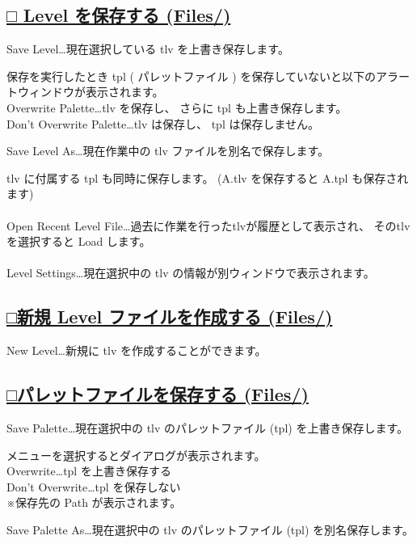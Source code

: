 \documentclass[a4paper,10pt]{article}
\begin{document}
\subsection*{\uline{□ Level を保存する (Files/)}}

\normalsize
\noindent Save Level…現在選択している tlv を上書き保存します。\par
\footnotesize
\noindent 保存を実行したとき tpl ( パレットファイル ) を保存していないと以下のアラートウィンドウが表示されます。\\
Overwrite Palette…tlv を保存し、 さらに tpl も上書き保存します。\\
Don't Overwrite Palette…tlv は保存し、 tpl は保存しません。\\[-0.7em]
\par
\normalsize
\noindent Save Level As…現在作業中の tlv ファイルを別名で保存します。\par
\footnotesize
\noindent tlv に付属する tpl も同時に保存します。 (A.tlv を保存すると A.tpl も保存されます)\\[-1em]
\\
\normalsize
Open Recent Level File…過去に作業を行ったtlvが履歴として表示され、 そのtlvを選択すると Load します。\\[-0.6em]
\\
Level Settings…現在選択中の tlv の情報が別ウィンドウで表示されます。\\[-0.5em]

\subsection*{\uline{□新規 Level ファイルを作成する (Files/)}}

\noindent New Level…新規に tlv を作成することができます。\\[-0.7em]

\subsection*{\uline{□パレットファイルを保存する (Files/)}}

\noindent Save Palette…現在選択中の tlv のパレットファイル (tpl) を上書き保存します。\par
\footnotesize
\noindent メニューを選択するとダイアログが表示されます。\\
Overwrite…tpl を上書き保存する\\
Don't Overwrite…tpl を保存しない\\
※保存先の Path が表示されます。\\[-1.2em]
\par
\normalsize
\noindent Save Palette As…現在選択中の tlv のパレットファイル (tpl) を別名保存します。
\end{document}
